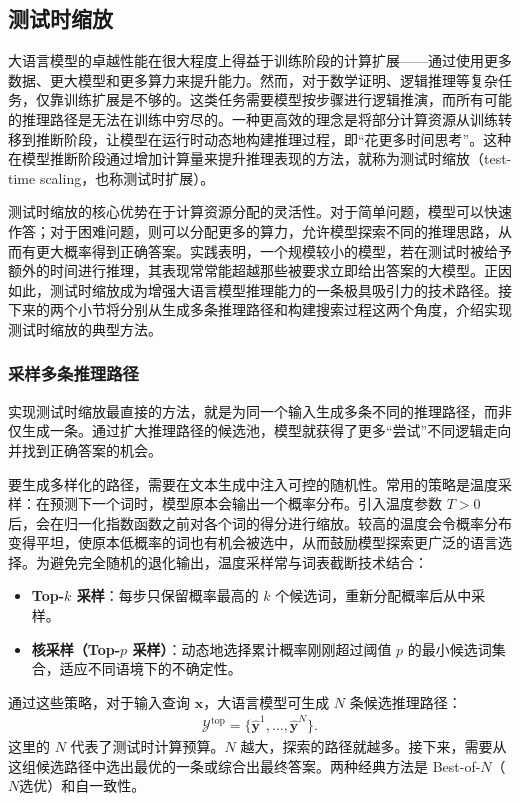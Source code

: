 \subsection{测试时缩放}

大语言模型的卓越性能在很大程度上得益于训练阶段的计算扩展——通过使用更多数据、更大模型和更多算力来提升能力。然而，对于数学证明、逻辑推理等复杂任务，仅靠训练扩展是不够的。这类任务需要模型按步骤进行逻辑推演，而所有可能的推理路径是无法在训练中穷尽的。一种更高效的理念是将部分计算资源从训练转移到推断阶段，让模型在运行时动态地构建推理过程，即“花更多时间思考”。这种在模型推断阶段通过增加计算量来提升推理表现的方法，就称为测试时缩放（test-time scaling，也称测试时扩展）。

测试时缩放的核心优势在于计算资源分配的灵活性。对于简单问题，模型可以快速作答；对于困难问题，则可以分配更多的算力，允许模型探索不同的推理思路，从而有更大概率得到正确答案。实践表明，一个规模较小的模型，若在测试时被给予额外的时间进行推理，其表现常常能超越那些被要求立即给出答案的大模型。正因如此，测试时缩放成为增强大语言模型推理能力的一条极具吸引力的技术路径。接下来的两个小节将分别从生成多条推理路径和构建搜索过程这两个角度，介绍实现测试时缩放的典型方法。

\subsubsection{采样多条推理路径}
\label{sec:sampling-reasoning-paths}

实现测试时缩放最直接的方法，就是为同一个输入生成多条不同的推理路径，而非仅生成一条。通过扩大推理路径的候选池，模型就获得了更多“尝试”不同逻辑走向并找到正确答案的机会。

要生成多样化的路径，需要在文本生成中注入可控的随机性。常用的策略是温度采样：在预测下一个词时，模型原本会输出一个概率分布。引入温度参数 $T>0$ 后，会在归一化指数函数之前对各个词的得分进行缩放。较高的温度会令概率分布变得平坦，使原本低概率的词也有机会被选中，从而鼓励模型探索更广泛的语言选择。为避免完全随机的退化输出，温度采样常与词表截断技术结合：

\begin{itemize}
  \item \textbf{Top-$k$ 采样}：每步只保留概率最高的 $k$ 个候选词，重新分配概率后从中采样。
  \item \textbf{核采样（Top-$p$ 采样）}：动态地选择累计概率刚刚超过阈值 $p$ 的最小候选词集合，适应不同语境下的不确定性。
\end{itemize}

通过这些策略，对于输入查询 $\mathbf{x}$，大语言模型可生成 $N$ 条候选推理路径：
\begin{eqnarray}
\mathcal{Y}^{\mathrm{top}} = \{\hat{\mathbf{y}}^1, \dots, \hat{\mathbf{y}}^N\}.
\end{eqnarray}
这里的 $N$ 代表了测试时计算预算。$N$ 越大，探索的路径就越多。接下来，需要从这组候选路径中选出最优的一条或综合出最终答案。两种经典方法是 Best-of-$N$（$N$选优）和自一致性。

